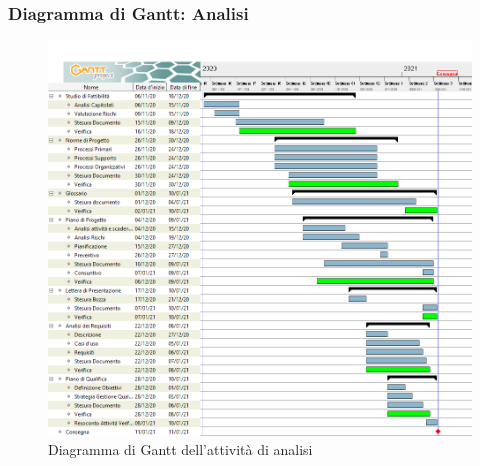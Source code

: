 \subsubsection{Diagramma di Gantt: Analisi}
\begin{figure}[ht]
    \centering
    \includegraphics[width=\textwidth]{Immagini/GanttAnalisi}
    \caption{Diagramma di Gantt dell'attività di analisi}
\end{figure}
